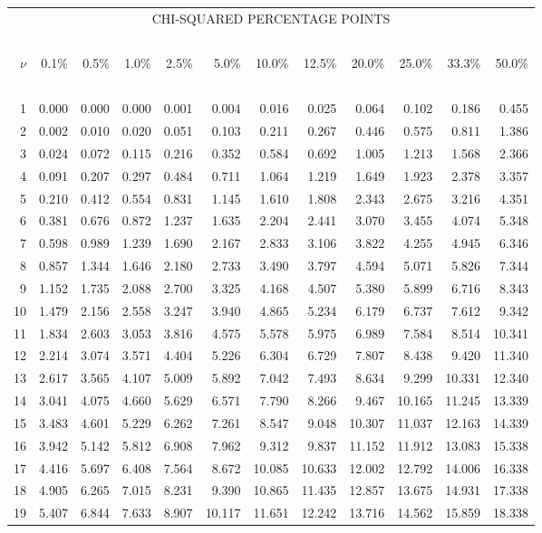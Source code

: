 {\small
\begin{center}
\begin{tabular}
      {r@{\ }r@{\ }r@{\ }r@{\ }r@{\ }r@{\ }r@{\ }r@{\ }r@{\ }r@{\ }r@{\ }r}
\multicolumn{12}{c}{CHI-SQUARED PERCENTAGE POINTS}\\
\ \\
$\nu$&0.1\%&0.5\%&1.0\%&2.5\%&5.0\%&10.0\%&12.5\%&20.0\%&25.0\%&33.3\%&50.0\%\\
\ \\
 1&0.000&0.000&0.000&0.001&0.004&0.016&0.025&0.064&0.102&0.186&0.455\\
 2&0.002&0.010&0.020&0.051&0.103&0.211&0.267&0.446&0.575&0.811&1.386\\
 3&0.024&0.072&0.115&0.216&0.352&0.584&0.692&1.005&1.213&1.568&2.366\\
 4&0.091&0.207&0.297&0.484&0.711&1.064&1.219&1.649&1.923&2.378&3.357\\
 5&0.210&0.412&0.554&0.831&1.145&1.610&1.808&2.343&2.675&3.216&4.351\\
 6&0.381&0.676&0.872&1.237&1.635&2.204&2.441&3.070&3.455&4.074&5.348\\
 7&0.598&0.989&1.239&1.690&2.167&2.833&3.106&3.822&4.255&4.945&6.346\\
 8&0.857&1.344&1.646&2.180&2.733&3.490&3.797&4.594&5.071&5.826&7.344\\
 9&1.152&1.735&2.088&2.700&3.325&4.168&4.507&5.380&5.899&6.716&8.343\\
10&1.479&2.156&2.558&3.247&3.940&4.865&5.234&6.179&6.737&7.612&9.342\\
11&1.834&2.603&3.053&3.816&4.575&5.578&5.975&6.989&7.584&8.514&10.341\\
12&2.214&3.074&3.571&4.404&5.226&6.304&6.729&7.807&8.438&9.420&11.340\\
13&2.617&3.565&4.107&5.009&5.892&7.042&7.493&8.634&9.299&10.331&12.340\\
14&3.041&4.075&4.660&5.629&6.571&7.790&8.266&9.467&10.165&11.245&13.339\\
15&3.483&4.601&5.229&6.262&7.261&8.547&9.048&10.307&11.037&12.163&14.339\\
16&3.942&5.142&5.812&6.908&7.962&9.312&9.837&11.152&11.912&13.083&15.338\\
17&4.416&5.697&6.408&7.564&8.672&10.085&10.633&12.002&12.792&14.006&16.338\\
18&4.905&6.265&7.015&8.231&9.390&10.865&11.435&12.857&13.675&14.931&17.338\\
19&5.407&6.844&7.633&8.907&10.117&11.651&12.242&13.716&14.562&15.859&18.338\\

\end{tabular}
\end{center}}
